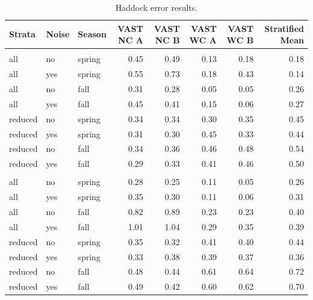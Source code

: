 \documentclass[
  12pt,
]{article}
\begin{document}
\begin{table}

\caption{\label{tab:HadERROR}Haddock error results.}
\centering
\fontsize{10}{12}\selectfont
\begin{tabular}[t]{lllrrrrr}
\toprule
Strata & Noise & Season & VAST NC  A & VAST NC  B & VAST WC A & VAST WC B & Stratified Mean\\
\midrule
\addlinespace[0.3em]
\multicolumn{1}{l}{\textbf{Constant Temp.}}\\
\hspace{1em}all & no & spring & 0.45 & 0.49 & 0.13 & 0.18 & 0.18\\
\hspace{1em}all & yes & spring & 0.55 & 0.73 & 0.18 & 0.43 & 0.14\\
\hspace{1em}all & no & fall & 0.31 & 0.28 & 0.05 & 0.05 & 0.26\\
\hspace{1em}all & yes & fall & 0.45 & 0.41 & 0.15 & 0.06 & 0.27\\
\hspace{1em}reduced & no & spring & 0.34 & 0.34 & 0.30 & 0.35 & 0.45\\
\hspace{1em}reduced & yes & spring & 0.31 & 0.30 & 0.45 & 0.33 & 0.44\\
\hspace{1em}reduced & no & fall & 0.34 & 0.36 & 0.46 & 0.48 & 0.54\\
\hspace{1em}reduced & yes & fall & 0.29 & 0.33 & 0.41 & 0.46 & 0.50\\
\addlinespace[0.3em]
\multicolumn{1}{l}{\textbf{Increasing Temp.}}\\
\hspace{1em}all & no & spring & 0.28 & 0.25 & 0.11 & 0.05 & 0.26\\
\hspace{1em}all & yes & spring & 0.35 & 0.30 & 0.11 & 0.06 & 0.31\\
\hspace{1em}all & no & fall & 0.82 & 0.89 & 0.23 & 0.23 & 0.40\\
\hspace{1em}all & yes & fall & 1.01 & 1.04 & 0.29 & 0.35 & 0.39\\
\hspace{1em}reduced & no & spring & 0.35 & 0.32 & 0.41 & 0.40 & 0.44\\
\hspace{1em}reduced & yes & spring & 0.33 & 0.38 & 0.39 & 0.37 & 0.36\\
\hspace{1em}reduced & no & fall & 0.48 & 0.44 & 0.61 & 0.64 & 0.72\\
\hspace{1em}reduced & yes & fall & 0.49 & 0.42 & 0.60 & 0.62 & 0.70\\
\bottomrule
\end{tabular}
\end{table}
\end{document}

